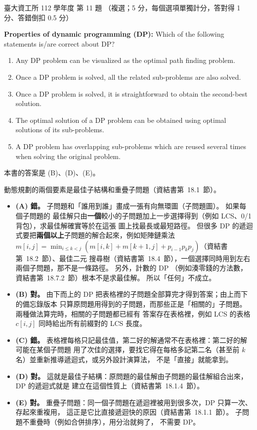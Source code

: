 \begin{pastexam}[label={px:ntu-112-dsa-11}]{臺大資工所 112 學年度 第 11 題}
（複選；5 分，每個選項單獨計分，答對得 1 分、答錯倒扣 0.5 分）

\textbf{Properties of dynamic programming (DP):} Which of the following statements is/are correct
about DP?
\begin{enumerate}[label=(\Alph*)]
\item Any DP problem can be visualized as the optimal path finding problem.
\item Once a DP problem is solved, all the related sub-problems are also solved.
\item Once a DP problem is solved, it is straightforward to obtain the second-best solution.
\item The optimal solution of a DP problem can be obtained using optimal solutions of its
sub-problems.
\item A DP problem has overlapping sub-problems which are reused several times when solving the
original problem.
\end{enumerate}
\end{pastexam}

\begin{pastsoln}
本書的答案是 (B)、(D)、(E)。

動態規劃的兩個要素是最佳子結構和重疊子問題（資結書第~18.1~節）。
\begin{itemize}
\item \textbf{(A) 錯。} 子問題和「誰用到誰」畫成一張有向無環圖（子問題圖）。 如果每個子問題的
最佳解只由\textbf{一個}較小的子問題加上一步選擇得到（例如 LCS、0/1 背包），求最佳解確實等於在這張
圖上找最長或最短路徑。 但很多 DP 的遞迴式要把\textbf{兩個以上}子問題的解合起來，例如矩陣鏈乘法
$m[i, j] = \min_{i \le k < j} (m[i, k] + m[k + 1, j] + p_{i-1} p_k p_j)$（資結書第~18.2~節）、最佳二元
搜尋樹（資結書第~18.4~節），一個選擇同時用到左右兩個子問題，那不是一條路徑。 另外，計數的 DP
（例如湊零錢的方法數，資結書第~18.7.2~節）根本不是求最佳解。 所以「任何」不成立。
\item \textbf{(B) 對。} 由下而上的 DP 把表格裡的子問題全部算完才得到答案；由上而下的備忘錄版本
只算原問題用得到的子問題，而那些正是「相關的」子問題。 兩種做法算完時，相關的子問題都已經有
答案存在表格裡，例如 LCS 的表格 $c[i, j]$ 同時給出所有前綴對的 LCS 長度。
\item \textbf{(C) 錯。} 表格裡每格只記最佳值，第二好的解通常不在表格裡：第二好的解可能在某個子問題
用了次佳的選擇，要找它得在每格多記第二名（甚至前 $k$ 名）並重新推導遞迴式，或另外設計演算法，
不是「直接」就能拿到。
\item \textbf{(D) 對。} 這就是最佳子結構：原問題的最佳解由子問題的最佳解組合出來，DP 的遞迴式就是
建立在這個性質上（資結書第~18.1.4~節）。
\item \textbf{(E) 對。} 重疊子問題：同一個子問題在遞迴裡被用到很多次，DP 只算一次、存起來重複用，
這正是它比直接遞迴快的原因（資結書第~18.1.1~節）。 子問題不重疊時（例如合併排序），用分治就夠了，
不需要 DP。
\end{itemize}
\end{pastsoln}
